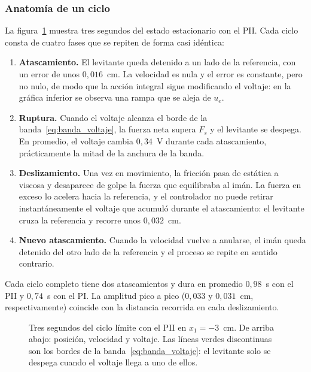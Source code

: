 \subsubsection{Anatomía de un ciclo}

La figura~\ref{fig:anatomia} muestra tres segundos del estado estacionario con el PII. Cada ciclo consta de cuatro fases que se repiten de forma casi idéntica:

\begin{enumerate}
  \item \textbf{Atascamiento.} El levitante queda detenido a un lado de la referencia, con un error de unos $0{,}016$~cm. La velocidad es nula y el error es constante, pero no nulo, de modo que la acción integral sigue modificando el voltaje: en la gráfica inferior se observa una rampa que se aleja de $u_e$.
  \item \textbf{Ruptura.} Cuando el voltaje alcanza el borde de la banda~\eqref{eq:banda_voltaje}, la fuerza neta supera $F_s$ y el levitante se despega. En promedio, el voltaje cambia $0{,}34$~V durante cada atascamiento, prácticamente la mitad de la anchura de la banda.
  \item \textbf{Deslizamiento.} Una vez en movimiento, la fricción pasa de estática a viscosa y desaparece de golpe la fuerza que equilibraba al imán. La fuerza en exceso lo acelera hacia la referencia, y el controlador no puede retirar instantáneamente el voltaje que acumuló durante el atascamiento: el levitante cruza la referencia y recorre unos $0{,}032$~cm.
  \item \textbf{Nuevo atascamiento.} Cuando la velocidad vuelve a anularse, el imán queda detenido del otro lado de la referencia y el proceso se repite en sentido contrario.
\end{enumerate}

Cada ciclo completo tiene dos atascamientos y dura en promedio $0{,}98$~s con el PII y $0{,}74$~s con el PI. La amplitud pico a pico ($0{,}033$ y $0{,}031$~cm, respectivamente) coincide con la distancia recorrida en cada deslizamiento.

\begin{figure}[ht]
    \centering
    
    \caption[Anatomía del ciclo límite]{Tres segundos del ciclo límite con el PII en $x_1=-3$~cm. De arriba abajo: posición, velocidad y voltaje. Las líneas verdes discontinuas son los bordes de la banda~\eqref{eq:banda_voltaje}: el levitante solo se despega cuando el voltaje llega a uno de ellos.}
    \label{fig:anatomia}
\end{figure}

